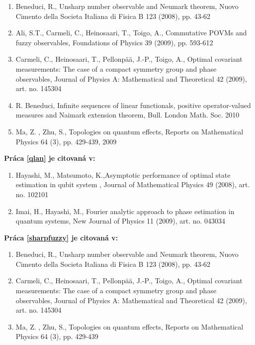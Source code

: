 \documentclass[A4paper]{article}
\begin{document}
\begin{enumerate}
\setcounter{enumi}{\value{poo}}
\item  Beneduci, R., Unsharp number observable and Neumark theorem, Nuovo Cimento  della Societa Italiana di Fisica B 123 (2008), pp. 43-62

\item  Ali, S.T., Carmeli, C., Heinosaari, T., Toigo, A., Commutative POVMs
and fuzzy observables, Foundations of Physics 39 (2009), pp. 593-612

\item  Carmeli, C., Heinosaari, T., Pellonpää, J.-P., Toigo, A., Optimal 
covariant measurements: The case of a compact symmetry group and phase 
observables, Journal of Physics A: Mathematical and Theoretical 42 (2009), art. no. 145304 

\item R. Beneduci, Infinite sequences of linear functionals, positive operator-valued measures and Naimark extension theorem, Bull. London Math. Soc. 2010 

\item Ma, Z. , Zhu, S., Topologies on quantum effects, Reports on Mathematical Physics 64 (3), pp. 429-439, 2009
\setcounter{poo}{\value{enumi}}

\end{enumerate}

{\bf Pr\'aca \ref{qlan} je citovan\'a v:}

\begin{enumerate}
\setcounter{enumi}{\value{poo}}
\item  Hayashi, M., Matsumoto, K.,Asymptotic performance of optimal state estimation in qubit system , Journal of Mathematical Physics 49 (2008), art. no. 102101

\item  Imai, H., Hayashi, M., Fourier analytic approach to phase estimation in quantum systems, New Journal of Physics 11 (2009), art. no. 043034
\setcounter{poo}{\value{enumi}}

\end{enumerate}

{\bf Pr\'aca \ref{sharpfuzzy} je citovan\'a v:}

\begin{enumerate}
\setcounter{enumi}{\value{poo}}
\item   Beneduci, R., Unsharp number observable and Neumark theorem, Nuovo Cimento  della Societa Italiana di Fisica B 123 (2008), pp. 43-62

\item   Carmeli, C., Heinosaari, T., Pellonpää, J.-P., Toigo, A., Optimal 
covariant measurements: The case of a compact symmetry group and phase 
observables, Journal of Physics A: Mathematical and Theoretical 42 (2009), art. no. 145304 

\item Ma, Z. , Zhu, S., Topologies on quantum effects, Reports on Mathematical Physics 64 (3), pp. 429-439
\setcounter{poo}{\value{enumi}}

\end{enumerate}
\end{document}
